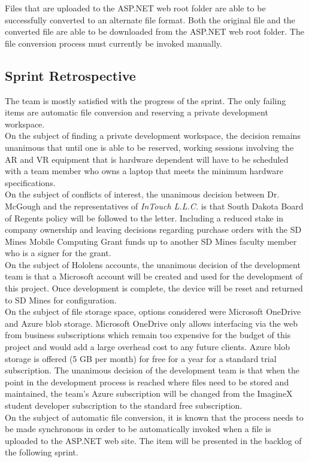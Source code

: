        Files that are uploaded to the ASP.NET web root folder are able to be successfully converted to an alternate
        file format.  Both the original file and the converted file are able to be downloaded from the ASP.NET web root
        folder.  The file conversion process must currently be invoked manually.\\

    \subsection{Sprint Retrospective}
    \label{sec:Sprint3_retrospective}
        \hspace{7mm}
        The team is mostly satisfied with the progress of the sprint.  The only failing items are automatic file
        conversion and reserving a private development workspace.\\

        On the subject of finding a private development workspace, the decision remains unanimous that until one 
        is able to be reserved, working sessions involving the AR and VR equipment that is hardware dependent 
        will have to be scheduled with a team member who owns a laptop that meets the minimum hardware
        specifications.\\

        On the subject of conflicts of interest, the unanimous decision between Dr. McGough and the representatives
        of \textit{InTouch L.L.C.} is that South Dakota Board of Regents policy will be followed to the letter.
        Including a reduced stake in company ownership and leaving decisions regarding purchase orders with the SD 
        Mines Mobile Computing Grant funds up to another SD Mines faculty member who is a signer for the grant.\\
        
        On the subject of Hololens accounts, the unanimous decision of the development team is that a Microsoft
        account will be created and used for the development of this project.  Once development is complete, the 
        device will be reset and returned to SD Mines for configuration.\\

        On the subject of file storage space, options considered were Microsoft OneDrive and Azure blob storage.
        Microsoft OneDrive only allows interfacing via the web from business subscriptions which remain too 
        expensive for the budget of this project and would add a large overhead cost to any future clients.
        Azure blob storage is offered (5 GB per month) for free for a year for a standard trial subscription.
        The unanimous decision of the development team is that when the point in the development process is reached
        where files need to be stored and maintained, the team's Azure subscription will be changed from the 
        ImagineX student developer subscription to the standard free subscription.\\
        
        On the subject of automatic file conversion, it is known that the process needs to be made synchronous
        in order to be automatically invoked when a file is uploaded to the ASP.NET web site.  The item will be
        presented in the backlog of the following sprint.
